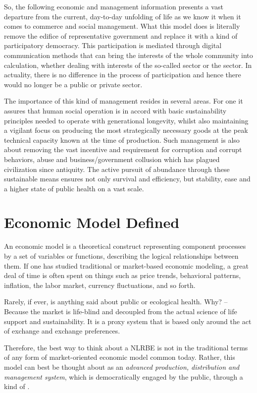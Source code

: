 \documentclass[10pt, a4paper, cleardoubleempty, openright, twoside]{book}
\begin{document}
So, the following economic and management information presents a vast
departure from the current, day-to-day unfolding of life as we know it
when it comes to commerce and social management. What this model does is
literally remove the edifice of representative government and replace it
with a kind of participatory democracy. This participation is mediated
through digital communication methods that can bring the interests of
the whole community into calculation, whether dealing with interests of
the so-called  sector or the 
sector. In actuality, there is no difference in the process of
participation and hence there would no longer be a public or private
sector.

The importance of this kind of management resides in several areas. For
one it assures that human social operation is in accord with basic
sustainability principles needed to operate with generational longevity,
whilst also maintaining a vigilant focus on producing the most
strategically necessary goods at the peak technical capacity known at
the time of production. Such management is also about removing the vast
incentive and requirement for corruption and corrupt behaviors, abuse
and business/government collusion which has plagued civilization since
antiquity. The active pursuit of abundance through these sustainable
means ensures not only survival and efficiency, but stability, ease and
a higher state of public health on a vast scale.

\section {Economic Model Defined}

An economic model is a theoretical construct representing component
processes by a set of variables or functions, describing the logical
relationships between them. If one has studied traditional or
market-based economic modeling, a great deal of time is often spent on
things such as price trends, behavioral patterns, inflation, the labor
market, currency fluctuations, and so forth.

Rarely, if ever, is anything said about public or ecological health.
Why? -- Because the market is life-blind and decoupled from the actual science of life support and sustainability. It is a proxy system that is based only around the act of exchange and exchange preferences.

Therefore, the best way to think about a NLRBE is not in the traditional
terms of any form of market-oriented economic model common today.
Rather, this model can best be thought about as an \emph{advanced
production, distribution and management system}, which is democratically
engaged by the public, through a kind of .
\end{document}
